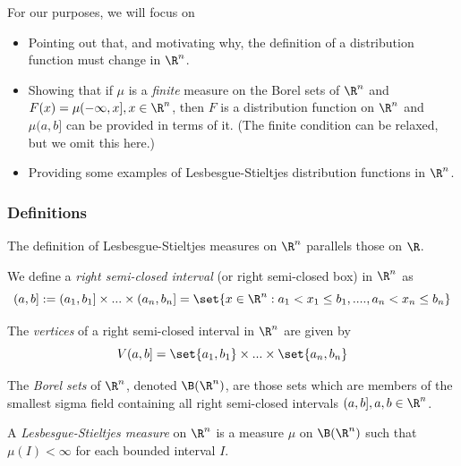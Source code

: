 \documentclass{article} %
\begin{document}
For our purposes, we will focus on
\begin{itemize}
\item Pointing out that, and motivating why, the definition of a distribution function must change in $\R^n$.
\item Showing that if $\mu$ is a \textit{finite} measure on the Borel sets of $\R^n$ and $F(x) = \mu(-\infty, x], x \in \R^n$, then $F$ is a distribution function on $\R^n$ and $\mu(a,b]$ can be provided in terms of it.     (The finite condition can be relaxed, but we omit this here.) %
\item Providing some examples of Lesbesgue-Stieltjes distribution functions in $\R^n$. 
\end{itemize}

 
\subsubsection{Definitions}
The definition of Lesbesgue-Stieltjes measures on $\R^n$ parallels those on $\R$.

\begin{definition}
We define a \textit{right semi-closed interval} (or right semi-closed box) in $\R^n$ as
\[ (a,b] :=	(a_1,b_1] \times ... \times (a_n, b_n]  = \set{x \in \R^n : a_1 < x_1 \leq b_1, ...., a_n < x_n \leq b_n }\]
\end{definition}
\begin{definition}
The \textit{vertices} of a right semi-closed interval in $\R^n$ are given by
\[ V(a,b] = \set{a_1,b_1} \times ... \times \set{a_n, b_n}\]
\label{def:vertices_of_rsc_interval_in_Rn}
\end{definition}

\begin{definition}
The \textit{Borel sets} of 	$\R^n$, denoted $\B(\R^n)$, are those sets which are members of the smallest sigma field containing all right semi-closed intervals $(a,b], a,b \in \R^n$. 
\end{definition}

\begin{definition}
A \textit{Lesbesgue-Stieltjes measure} on $\R^n$ is a measure $\mu$ on $\B(\R^n)$ such that $\mu(I) < \infty$ for each bounded interval $I$. 	
\end{definition}
\end{document}
